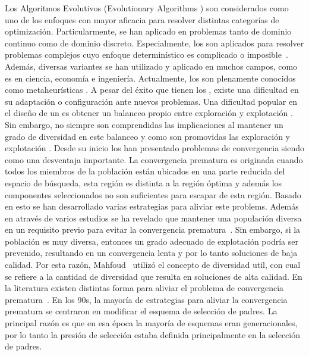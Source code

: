 Los Algoritmos Evolutivos (Evolutionary Algorithms \EA{}) son considerados como uno de los enfoques con mayor aficacia para resolver distintas categorías de optimización.
%
Particularmente, se han aplicado en problemas tanto de dominio continuo \cite{glover2005handbook} como de dominio discreto.
%
Especialmente, los \EAS{} son aplicados para resolver problemas complejos cuyo enfoque determinístico es complicado o imposible~\cite{chakraborty2008advances}.
% 
Además, diversas variantes se han utilizado y aplicado en muchos campos, como es en ciencia, economía e ingeniería.
%
%
Actualmente, los \EAS{} son plenamente conocidos como metaheurísticas \cite{glover2005handbook}.
%
A pesar del éxito que tienen los \EAS{}, existe una dificultad en su adaptación o configuración ante nuevos problemas.
%
Una dificultad popular en el diseño de un \EA{} es obtener un balanceo propio entre exploración y explotación \cite{herrera1996adaptation}.
%
Sin embargo, no siempre son comprendidas las implicaciones al mantener un grado de diversidad en este balanceo y como son promovidas las exploración y explotación \cite{Crepinsek:13}.
%
Desde su inicio los \EAS{} han presentado problemas de convergencia siendo como una desventaja importante\cite{Crepinsek:13}.
%
La convergencia prematura es originada cuando todos los miembros de la población están ubicados en una parte reducida del espacio de búsqueda, esta región es distinta a la región óptima y además los componentes seleccionados no son suficientes para escapar de esta región.
%
Basado en esto se han desarrollado varias estrategias para aliviar este problems.
%
Además en através de varios estudios se ha revelado que mantener una populación diversa en un requisito previo para evitar la convergencia prematura~\cite{Crepinsek:13}.
%
Sin embargo, si la población es muy diversa, entonces un grado adecuado de explotación podría ser prevenido, resultando en un convergencia lenta y por lo tanto soluciones de baja calidad.
%
Por esta razón, Mahfoud~\cite{dasgupta2013evolutionary} utilizó el concepto de diversidad util, con cual se refiere a la cantidad de diversidad que resulta en soluciones de alta calidad.
%
En la literatura existen distintas forma para aliviar el problema de convergencia prematura~\cite{pandey2014comparative}.
%
En los 90s, la mayoría de estrategias para aliviar la convergencia prematura se centraron en modificar el esquema de selección de padres.
%
La principal razón es que en esa época la mayoría de esquemas eran generacionales, por lo tanto la presión de selección estaba definida principalmente en la selección de padres.
